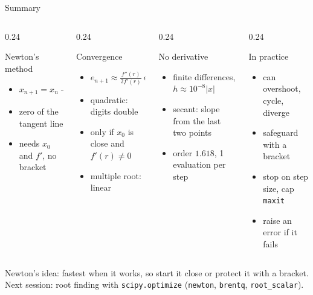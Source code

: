 \documentclass[aspectratio=169]{beamer}
\begin{document}
\begin{frame}{Summary}
\begin{columns}[T]
\begin{column}{0.24\textwidth}
\begin{block}{Newton's method}
\scriptsize
\begin{itemize}
  \item $x_{n+1} = x_n - \frac{f(x_n)}{f'(x_n)}$
  \item zero of the tangent line
  \item needs $x_0$ and $f'$, no bracket
\end{itemize}
\end{block}
\end{column}
\begin{column}{0.24\textwidth}
\begin{block}{Convergence}
\scriptsize
\begin{itemize}
  \item $e_{n+1} \approx \frac{f''(r)}{2f'(r)}\, e_n^2$
  \item quadratic: digits double
  \item only if $x_0$ is close and $f'(r) \ne 0$
  \item multiple root: linear
\end{itemize}
\end{block}
\end{column}
\begin{column}{0.24\textwidth}
\begin{block}{No derivative}
\scriptsize
\begin{itemize}
  \item finite differences, $h \approx 10^{-8}|x|$
  \item secant: slope from the last two points
  \item order $1.618$, 1 evaluation per step
\end{itemize}
\end{block}
\end{column}
\begin{column}{0.24\textwidth}
\begin{block}{In practice}
\scriptsize
\begin{itemize}
  \item can overshoot, cycle, diverge
  \item safeguard with a bracket
  \item stop on step size, cap \texttt{maxit}
  \item raise an error if it fails
\end{itemize}
\end{block}
\end{column}
\end{columns}
\vspace{0.4cm}
\centering
\small Newton's idea: fastest when it works, so start it close or protect it with a bracket.\\[3pt]
\scriptsize Next session: root finding with \texttt{scipy.optimize} (\texttt{newton}, \texttt{brentq}, \texttt{root\_scalar}).
\end{frame}
\end{document}
